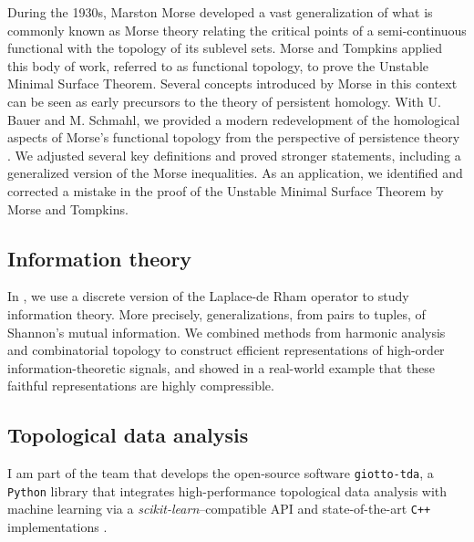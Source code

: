 During the 1930s, Marston Morse developed a vast generalization of what is commonly known as Morse theory relating the critical points of a semi-continuous functional with the topology of its sublevel sets.
Morse and Tompkins applied this body of work, referred to as functional topology, to prove the Unstable Minimal Surface Theorem.
Several concepts introduced by Morse in this context can be seen as early precursors to the theory of persistent homology.
With U. Bauer and M. Schmahl, we provided a modern redevelopment of the homological aspects of Morse's functional topology from the perspective of persistence theory \cite{medina2021functional}.
We adjusted several key definitions and proved stronger statements, including a generalized version of the Morse inequalities.
As an application, we identified and corrected a mistake in the proof of the Unstable Minimal Surface Theorem by Morse and Tompkins.

\subsection{Information theory}

In \cite{medina2021hyperharmonic}, we use a discrete version of the Laplace-de Rham operator to study information theory.
More precisely, generalizations, from pairs to tuples, of Shannon's mutual information.
We combined methods from harmonic analysis and combinatorial topology to construct efficient representations of high-order information-theoretic signals, and showed in a real-world example that these faithful representations are highly compressible.

\subsection{Topological data analysis} \label{ss:giotto}

I am part of the team that develops the open-source software \texttt{giotto-tda}, a \texttt{Python} library that integrates high-performance topological data analysis with machine learning via a \emph{scikit-learn}--compatible API and state-of-the-art \texttt{C++} implementations \cite{medina2021giotto}.